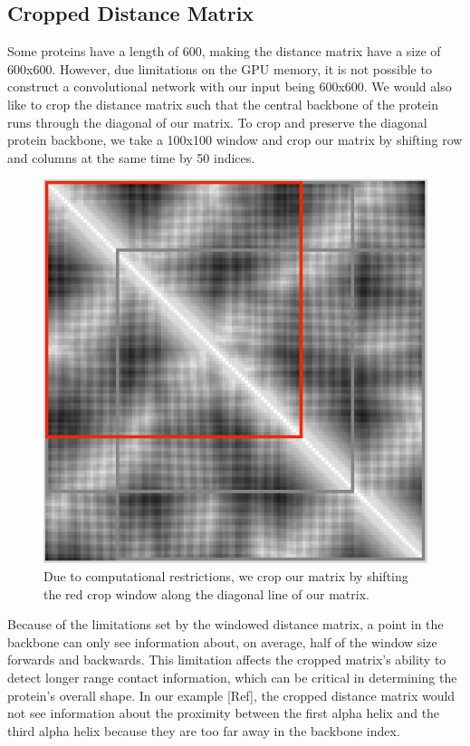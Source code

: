 \documentclass[12pt, a4paper, twocolumn, fullpage]{article}
\theoremstyle{plain}
\theoremstyle{definition}
\theoremstyle{remark}
\begin{document}
\subsection{ Cropped Distance Matrix}

Some proteins have a length of 600, making the distance matrix have a size of 600x600. However, due limitations on the GPU memory, it is not possible to construct a convolutional network with our input being 600x600. We would also like to crop the distance matrix such that the central backbone of the protein runs through the diagonal of our matrix. To crop and preserve the diagonal protein backbone, we take a 100x100 window and crop our matrix by shifting row and columns at the same time by 50 indices.

\begin{figure}[h]
    \centering
    \includegraphics[width=.7\linewidth]{cropMat}
    \caption{Due to computational restrictions, we crop our matrix by shifting the red crop window along the diagonal line of our matrix.}
    \label{cropMat}
\end{figure}

Because of the limitations set by the windowed distance matrix, a point in the backbone can only see information about, on average, half of the window size forwards and backwards. This limitation affects the cropped matrix's ability to detect longer range contact information, which can be critical in determining the protein's overall shape. In our example [Ref], the cropped distance matrix would not see information about the proximity between the first alpha helix and the third alpha helix because they are too far away in the backbone index.
\end{document}
